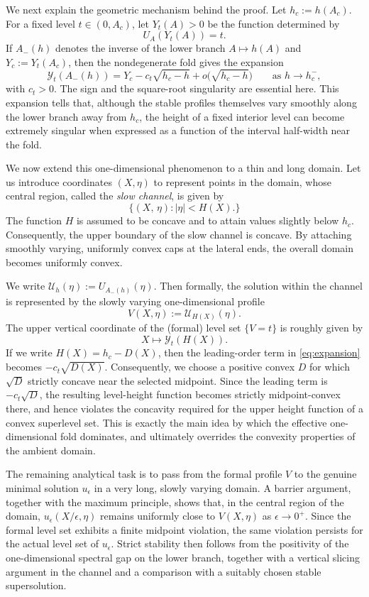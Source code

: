 \documentclass[reqno,12pt]{amsart}
\numberwithin{equation}{section}
\theoremstyle{remark}
\begin{document}
We next explain the geometric mechanism behind the proof.  Let $h_c:=h(A_c)$.
For a fixed level $t\in(0,A_c)$, let $Y_t(A)>0$ be the function determined by
$$
        U_A(Y_t(A))=t.
$$
If $A_-(h)$ denotes the inverse of the lower branch $A\mapsto h(A)$ and $Y_c:=Y_t(A_c)$, then the nondegenerate fold gives the expansion
\begin{equation}\label{eq:expansion}
        \mathcal Y_t(A_-(h)) =Y_c-c_t\sqrt{h_c-h}+o\bigl(\sqrt{h_c-h}\bigr)
        \qquad\text{as }h\to h_c^-,
\end{equation}
with $c_t>0$.  The sign and the square-root singularity are essential here.  This expansion tells  that, although the stable profiles themselves vary smoothly along the
lower branch away from $h_c$, the height of a fixed interior level can become extremely singular when expressed as a function of the interval half-width near the fold. 

We now extend this one-dimensional phenomenon to a thin and long domain. Let us introduce coordinates $(X,\eta)$ to represent points in the domain, whose central region, called the \emph{slow channel}, is given by
$$
\{(X,\,\eta)\colon |\eta| < H(X).\}
$$
The function $H$ is assumed to be concave and to attain values slightly below $h_c$. Consequently, the upper boundary of the slow channel is concave. By attaching smoothly varying, uniformly convex caps at the lateral ends, the overall domain becomes uniformly convex.

We write $\mathcal U_h(\eta):=U_{A_-(h)}(\eta)$. 
Then formally, the solution within the channel is represented by the slowly varying one-dimensional profile
$$
 V(X,\eta) := \mathcal U_{H(X)}(\eta).
$$
The upper vertical coordinate of the (formal) level set $\{V = t\}$ is roughly given by
$$
X\longmapsto \mathcal Y_t(H(X)).
$$
If we write $H(X) = h_c - D(X)$, then the leading-order term in \eqref{eq:expansion} becomes $-c_t \sqrt{D(X)}$. Consequently, we choose a positive convex $D$ for which $\sqrt D$ strictly concave near the selected midpoint. Since the leading term is $-c_t\sqrt D$, the resulting level-height function becomes strictly midpoint-convex there, and hence violates the concavity required
for the upper height function of a convex superlevel set. This is exactly the main idea by which the effective one-dimensional fold dominates, and ultimately overrides the convexity properties of the ambient domain.

The remaining analytical task is to pass from the formal profile $V$ to the genuine minimal solution $u_\epsilon$ in a very long, slowly varying domain. A barrier argument, together with the maximum principle, shows that, in the central region of the domain, 
$u_\epsilon(X/\epsilon,\eta)$
remains uniformly close to $V(X,\eta)$ as $\epsilon \to 0^+$. Since the formal level set exhibits a finite midpoint violation, the same violation persists for the actual level set of $u_\epsilon$. Strict stability then follows from the positivity of the one-dimensional spectral gap on the lower branch, together with a vertical slicing argument in the channel and a comparison with a suitably chosen stable supersolution.
\end{document}
